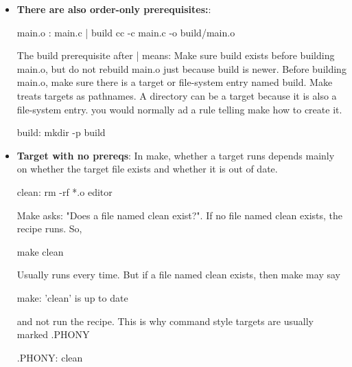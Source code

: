 \documentclass{report}
\begin{document}
\begin{itemize}
\begin{itemize}
                \item Is defs.h newer than main.o?
            \end{itemize}
            If main.o does not exist, or if any prerequisite is newer than main.o, then make runs the recipe.
        \item \textbf{There are also order-only prerequisites:}: 
            \bigbreak \noindent 
            \begin{bashcode}
            main.o : main.c | build
                cc -c main.c -o build/main.o
            \end{bashcode}
            The build prerequisite after | means: Make sure build exists before building main.o, but do not rebuild main.o just because build is newer.
            \bigbreak \noindent 
            Before building main.o, make sure there is a target or file-system entry named build.
            \bigbreak \noindent 
            Make treats targets as pathnames. A directory can be a target because it is also a file-system entry.
            \bigbreak \noindent 
            you would normally ad a rule telling make how to create it.
            \bigbreak \noindent 
            \begin{bashcode}
            build:
                mkdir -p build
            \end{bashcode}
        \item \textbf{Target with no prereqs}: In make, whether a target runs depends mainly on whether the target file exists and whether it is out of date.
            \bigbreak \noindent 
            \begin{bashcode}
            clean: 
                rm -rf *.o editor
            \end{bashcode}
            \bigbreak \noindent 
            Make asks: "Does a file named clean exist?". If no file named clean exists, the recipe runs. So,
            \bigbreak \noindent 
            \begin{bashcode}
            make clean
            \end{bashcode}
            \bigbreak \noindent 
            Usually runs every time. But if a file named clean exists, then make may say
            \bigbreak \noindent 
            \begin{bashcode}
                make: 'clean' is up to date
            \end{bashcode}
            \bigbreak \noindent 
            and not run the recipe. This is why command style targets are usually marked .PHONY
            \bigbreak \noindent 
            \begin{bashcode}
            .PHONY: clean


\end{bashcode}
\end{itemize}
\end{document}
